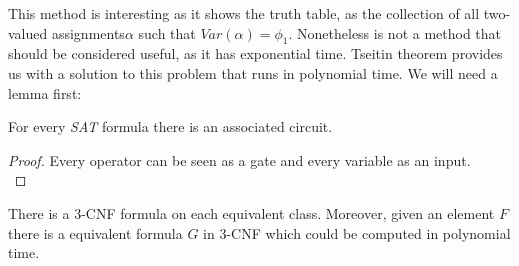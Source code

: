   This method is interesting as it shows the truth table, as the collection of all two-valued assignments$\alpha$ such that $Var(\alpha) = \phi_1$. Nonetheless is not a method that should be considered useful, as it has exponential time. Tseitin theorem provides us with a solution to this problem that runs in polynomial time. We will need a lemma first:

  \begin{lemma}
    For every \emph{SAT} formula there is an associated circuit.
  \end{lemma}
  \begin{proof}
    Every operator can be seen as a gate and every variable as an input.\\
  \end{proof}
  
  \begin{theorem} \label{the:Tseitin}
    There is a 3-CNF formula on each equivalent class. Moreover, given an element $F$  there is a equivalent formula $G$  in 3-CNF which could be computed in polynomial time. 
  \end{theorem}

